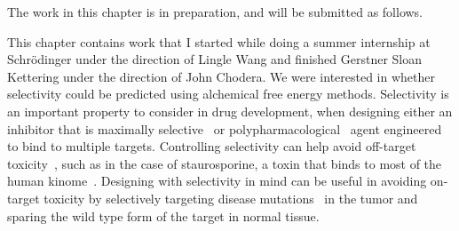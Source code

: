 \documentclass[phd,tocprelim]{cornell}
\begin{document}
The work in this chapter is in preparation, and will be submitted as follows. 
\realsinglespacing
{}

\realdoublespacing
This chapter contains work that I started while doing a summer internship at Schr\"{o}dinger under the direction of Lingle Wang and finished Gerstner Sloan Kettering under the direction of John Chodera. We were interested in whether selectivity could be predicted using alchemical free energy methods. Selectivity is an important property to consider in drug development, when designing either an inhibitor that is maximally selective~\citep{Zhang2009-il,Huggins2012-hr} or polypharmacological~\citep{Fan2007-hm,Apsel2008-it,Knight:Nat.Rev.Cancer:2010,Hopkins2006-qu,Hopkins2008-ij} agent engineered to bind to multiple targets. Controlling selectivity can help avoid off-target toxicity~\citep{Kijima2011-xs,Liu2014-yi}, such as in the case of staurosporine, a toxin that binds to most of the human kinome~\citep{Davis:Nat.Biotechnol.:2011}.  Designing with selectivity in mind can be useful in avoiding on-target toxicity by selectively targeting disease mutations~\citep{Rudmann2013-hi} in the tumor and sparing the wild type form of the target in normal tissue. 
\end{document}
